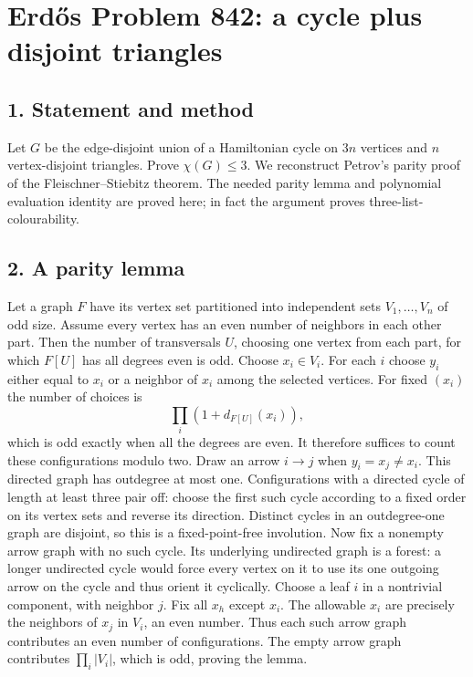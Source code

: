 \section*{Erd\H{o}s Problem 842: a cycle plus disjoint triangles}
\subsection*{1. Statement and method}
Let $G$ be the edge-disjoint union of a Hamiltonian cycle on $3n$ vertices and $n$ vertex-disjoint triangles. Prove $\chi(G)\le3$. We reconstruct Petrov's parity proof of the Fleischner--Stiebitz theorem. The needed parity lemma and polynomial evaluation identity are proved here; in fact the argument proves three-list-colourability.
\subsection*{2. A parity lemma}
Let a graph $F$ have its vertex set partitioned into independent sets $V_1,\ldots,V_n$ of odd size. Assume every vertex has an even number of neighbors in each other part. Then the number of transversals $U$, choosing one vertex from each part, for which $F[U]$ has all degrees even is odd.
Choose $x_i\in V_i$. For each $i$ choose $y_i$ either equal to $x_i$ or a neighbor of $x_i$ among the selected vertices. For fixed $(x_i)$ the number of choices is
\[
 \prod_i(1+d_{F[U]}(x_i)),
\]
which is odd exactly when all the degrees are even. It therefore suffices to count these configurations modulo two.
Draw an arrow $i\to j$ when $y_i=x_j\ne x_i$. This directed graph has outdegree at most one. Configurations with a directed cycle of length at least three pair off: choose the first such cycle according to a fixed order on its vertex sets and reverse its direction. Distinct cycles in an outdegree-one graph are disjoint, so this is a fixed-point-free involution.
Now fix a nonempty arrow graph with no such cycle. Its underlying undirected graph is a forest: a longer undirected cycle would force every vertex on it to use its one outgoing arrow on the cycle and thus orient it cyclically. Choose a leaf $i$ in a nontrivial component, with neighbor $j$. Fix all $x_h$ except $x_i$. The allowable $x_i$ are precisely the neighbors of $x_j$ in $V_i$, an even number. Thus each such arrow graph contributes an even number of configurations. The empty arrow graph contributes $\prod_i|V_i|$, which is odd, proving the lemma.
